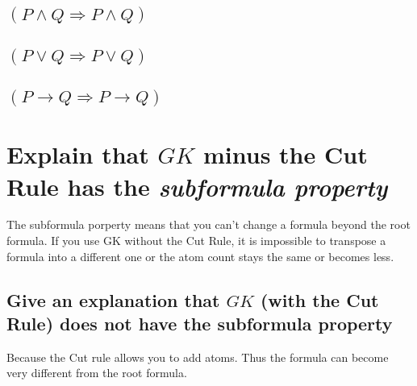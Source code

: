 \documentclass{article}
\begin{document}
\subsection{$(P\wedge Q \Rightarrow P \wedge Q)$}
\begin{prooftree}
\end{prooftree}
\subsection{$(P\vee Q \Rightarrow P \vee Q)$}
\begin{prooftree}
\end{prooftree}
\subsection{$(P \to Q \Rightarrow P \to Q)$}
\begin{prooftree}
\end{prooftree}
\section{Explain that $GK$ minus the Cut Rule has the \emph{subformula property}}
The subformula porperty means that you can't change a formula beyond the root
formula.
If you use GK without the Cut Rule, it is impossible to transpose a formula into
a different one or the atom count stays the same or becomes less.
\subsection{Give an explanation that $GK$ (with the Cut Rule) does not have
the subformula property}
Because the Cut rule allows you to add atoms. Thus the formula can become
very different from the root formula.
\end{document}

